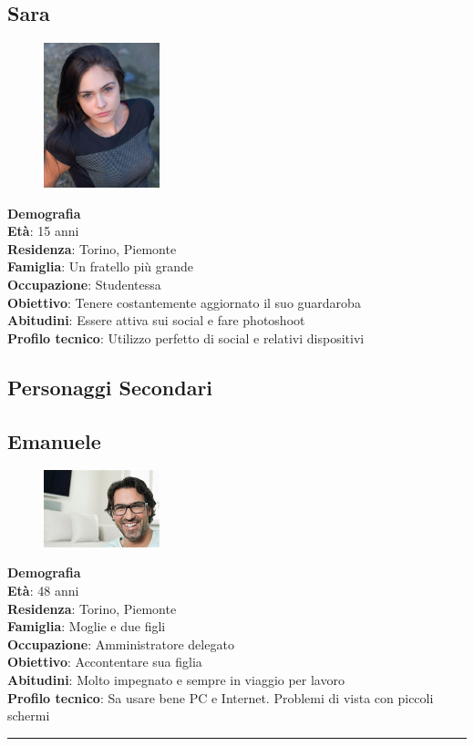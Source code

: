 \documentclass[12pt,a4paper]{report}
\begin{document}
\subsection*{Sara}
\begin{figure}
  \centering
  \includegraphics[width=0.3\textwidth]{"Images Latex/Personas/Sara"}
\end{figure}
\textbf{Demografia}\\
\indent\textbf{Età}: 15 anni\\
\indent\textbf{Residenza}: Torino, Piemonte\\
\indent\textbf{Famiglia}: Un fratello più grande\\
\indent\textbf{Occupazione}: Studentessa\\
\textbf{Obiettivo}: Tenere costantemente aggiornato il suo guardaroba\\
\textbf{Abitudini}: Essere attiva sui social e fare photoshoot\\
\textbf{Profilo tecnico}: Utilizzo perfetto di social e relativi dispositivi\\

\subsection{Personaggi Secondari}
\subsection*{Emanuele}
\begin{figure}
  \centering
    \includegraphics[width=0.3\textwidth]{"Images Latex/Personas/Emanuele"}
\end{figure}
\textbf{Demografia}\\
\indent \textbf{Età}: 48 anni\\
\indent \textbf{Residenza}: Torino, Piemonte\\
\indent \textbf{Famiglia}: Moglie e due figli\\
\indent \textbf{Occupazione}: Amministratore delegato\\
\textbf{Obiettivo}: Accontentare sua figlia\\
\textbf{Abitudini}: Molto impegnato e sempre in viaggio per lavoro\\
\textbf{Profilo tecnico}: Sa usare bene PC e Internet. Problemi di vista con piccoli schermi\\
\rule{\textwidth}{0.5pt}
\end{document}
